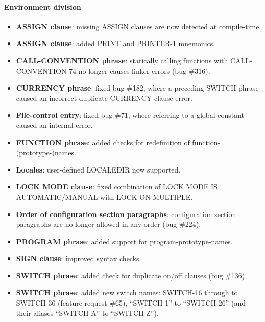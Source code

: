 \paragraph{Environment division}
\begin{itemize}
\item \textbf{ASSIGN clause}: missing ASSIGN clauses are now detected at compile-time.
\item \textbf{ASSIGN clause}: added PRINT and PRINTER-1 mnemonics.
\item \textbf{CALL-CONVENTION phrase}: statically calling functions with CALL-CONVENTION 74 no longer causes linker errors (bug \#316).
\item \textbf{CURRENCY phrase}: fixed bug \#182, where a preceding SWITCH phrase caused an incorrect duplicate CURRENCY clause error.
\item \textbf{File-control entry}: fixed bug \#71, where referring to a global constant caused an internal error.
\item \textbf{FUNCTION phrase}: added checks for redefinition of function-(prototype-)names.
\item \textbf{Locales}: user-defined LOCALEDIR now supported.
\item \textbf{LOCK MODE clause}: fixed combination of LOCK MODE IS AUTOMATIC/MANUAL with LOCK ON MULTIPLE.
\item \textbf{Order of configuration section paragraphs}: configuration section paragraphs are no longer allowed in any order (bug \#224).
\item \textbf{PROGRAM phrase}: added support for program-prototype-names.
\item \textbf{SIGN clause}: improved syntax checks.
\item \textbf{SWITCH phrase}: added check for duplicate on\slash{}off clauses (bug \#136).
\item \textbf{SWITCH phrase}: added new switch names: SWITCH-16 through to SWITCH-36 (feature request \#65), ``SWITCH 1'' to ``SWITCH 26'' (and their aliases  ``SWITCH A'' to ``SWITCH Z'').
\end{itemize}

